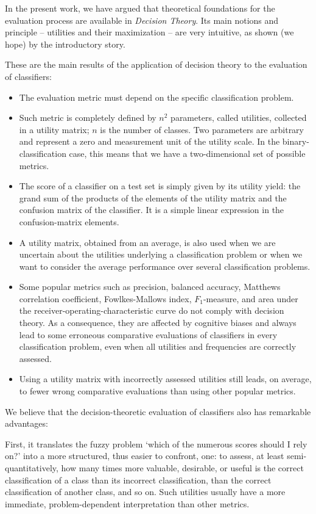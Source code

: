 \documentclass[\ifafour a4paper,12pt,\else a5paper,10pt,\fi%
onecolumn,oneside,article,%
british%
]{memoir}
\theoremstyle{remark}
\theoremstyle{innote}
\renewcommand*{\|}[1][]{\nonscript\:#1\vert\nonscript\:\mathopen{}}
\begin{document}
In the present work, we have argued that theoretical foundations for the evaluation process are available in \emph{Decision Theory}. Its main notions and principle -- utilities and their maximization -- are very intuitive, as shown (we hope) by the introductory story.

These are the main results of the application of decision theory to the evaluation of classifiers:
\begin{itemize}[wide]
\item The evaluation metric must depend on the specific classification problem.
\item Such metric is completely defined by $n^{2}$ parameters, called utilities, collected in a utility matrix; $n$ is the number of classes. Two parameters are arbitrary and represent a zero and measurement unit of the utility scale. In the binary-classification case, this means that we have a two-dimensional set of possible metrics.
\item The score of a classifier on a test set is simply given by its utility yield: the grand sum of the products of the elements of the utility matrix and the confusion matrix of the classifier. It is a simple linear expression in the confusion-matrix elements.
\item A utility matrix, obtained from an average, is also used when we are uncertain about the utilities underlying a classification problem or when we want to consider the average performance over several classification problems.
\item Some popular metrics such as precision, balanced accuracy, Matthews correlation coefficient, Fowlkes-Mallows index, $F_{1}$-measure, and area under the receiver-operating-characteristic curve do not comply with decision theory. As a consequence, they are affected by cognitive biases and always lead to some erroneous comparative evaluations of classifiers in every classification problem, even when all utilities and frequencies are correctly assessed.
\item Using a utility matrix with incorrectly assessed utilities still leads, on average, to fewer wrong comparative evaluations than using other popular metrics.
\end{itemize}

We believe that the decision-theoretic evaluation of classifiers also has remarkable advantages:

First, it translates the fuzzy problem \enquote*{which of the numerous scores should I rely on?} into a more structured, thus easier to confront, one: to assess, at least semi-quantitatively, how many times more valuable, desirable, or useful is the correct classification of a class than its incorrect classification, than the correct classification of another class, and so on. Such utilities usually have a more immediate, problem-dependent interpretation than other metrics.
\end{document}

